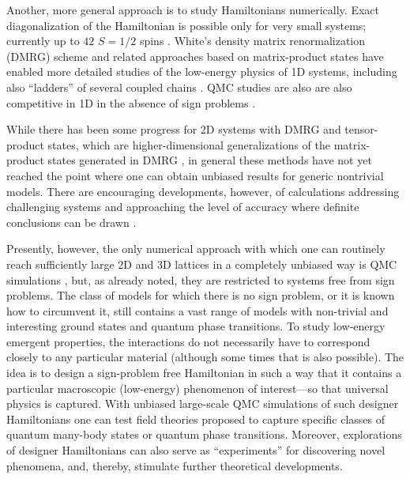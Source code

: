 \documentclass[range]{ar2e}
\begin{document}
Another, more general approach is to study Hamiltonians numerically. Exact diagonalization of the Hamiltonian is possible 
only for very small systems; currently up to $42$ $S=1/2$ spins \cite{Nakano11,Lauchli11}. White's density matrix 
renormalization (DMRG) scheme \cite{White92} and related approaches based on matrix-product states \cite{Schollwock05} 
have enabled more detailed studies of the low-energy physics of 1D systems, including also ``ladders'' of several coupled chains
\cite{Dagotto96}. QMC studies are also are also competitive in 1D in the absence of sign problems \cite{Sandvik04,Jeckelmann02,Mund09}.

While there has been some progress for 2D systems with DMRG \cite{Stoudenmire12} and tensor-product \cite{Murg09,Gu08,Xie09} states, which are
higher-dimensional generalizations of the  matrix-product states generated in DMRG \cite{Rommer97}, in general these methods have not yet reached the point 
where one  can obtain unbiased results for generic nontrivial models. There are encouraging developments, however, of calculations addressing challenging systems and 
approaching the level of accuracy where definite conclusions can be drawn \cite{Yan11,Bauer12}.

Presently, however, the only numerical approach with which one can routinely reach sufficiently large 2D and 3D lattices in a completely unbiased way 
is QMC simulations \cite{Evertz03,Sandvik10b}, but, as already noted, they are restricted to systems free from sign problems. The class of models 
for which there is no sign problem, or it is known how to circumvent it, still contains a vast range of models with non-trivial 
and interesting ground states and quantum phase transitions. To study low-energy emergent 
properties, the interactions do not necessarily have to correspond closely to any particular material (although some 
times that is also possible). The idea is to design a sign-problem free Hamiltonian in such a way that it contains a 
particular macroscopic (low-energy) phenomenon of interest---so that universal physics is captured. With unbiased large-scale 
QMC simulations of such designer Hamiltonians one can test field theories proposed to capture specific classes of quantum many-body 
states or quantum phase transitions. Moreover, explorations of designer Hamiltonians can also serve as ``experiments'' for 
discovering novel phenomena, and, thereby, stimulate further theoretical developments.
\end{document}
